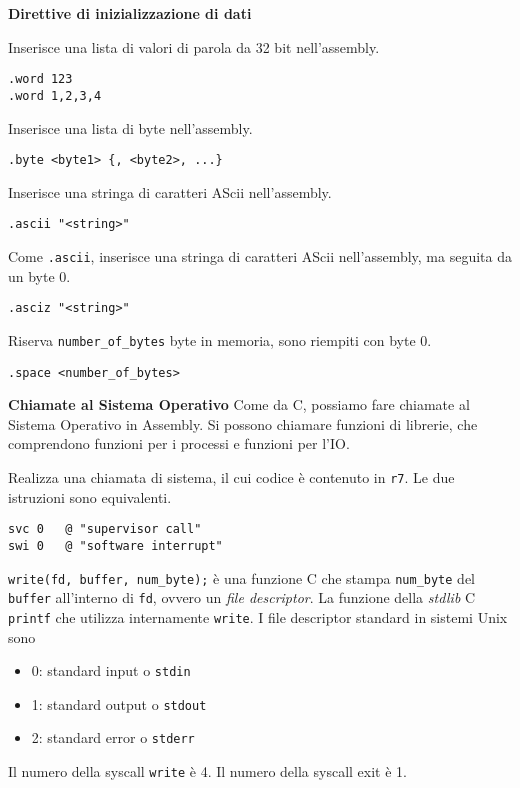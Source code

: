 \begin{defn}
\textbf{Direttive di inizializzazione di dati}

Inserisce una lista di valori di parola da 32 bit nell'assembly.
\begin{lstlisting}[style=arm]
.word 123
.word 1,2,3,4
\end{lstlisting}

Inserisce una lista di byte nell'assembly.
\begin{lstlisting}[style=arm]
.byte <byte1> {, <byte2>, ...}
\end{lstlisting}

Inserisce una stringa di caratteri AScii nell'assembly.
\begin{lstlisting}[style=arm]
.ascii "<string>"
\end{lstlisting}

Come \texttt{.ascii}, inserisce una stringa di caratteri AScii nell'assembly, ma seguita da un byte 0.
\begin{lstlisting}[style=arm]
.asciz "<string>"
\end{lstlisting}

Riserva \texttt{number\_of\_bytes} byte in memoria, sono riempiti con byte 0.
\begin{lstlisting}[style=arm]
.space <number_of_bytes>
\end{lstlisting}
\end{defn}

\begin{defn}
\textbf{Chiamate al Sistema Operativo}
Come da C, possiamo fare chiamate al Sistema Operativo in Assembly. Si possono chiamare funzioni di librerie, che comprendono funzioni per i processi e funzioni per l'IO.

Realizza una chiamata di sistema, il cui codice è contenuto in \texttt{r7}. Le due istruzioni sono equivalenti.
\begin{lstlisting}[style=arm]
svc 0	@ "supervisor call"
swi 0	@ "software interrupt"
\end{lstlisting}
\end{defn}

\begin{exmp}
\texttt{write(fd, buffer, num\_byte);} è una funzione C che
stampa \texttt{num\_byte} del \texttt{buffer} all'interno di
\texttt{fd}, ovvero un \textit{file descriptor}.
La funzione della \textit{stdlib} C \texttt{printf}
che utilizza internamente \texttt{write}.
I file descriptor standard in sistemi Unix sono
\begin{itemize}
	\item 0: standard input o \texttt{stdin}
	\item 1: standard output o \texttt{stdout}
	\item 2: standard error o \texttt{stderr}
\end{itemize}

Il numero della syscall \texttt{write} è 4. Il numero della syscall exit è 1.
\end{exmp}

